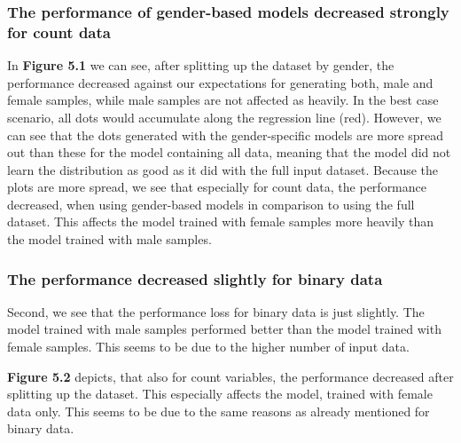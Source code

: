 \documentclass[11pt, a4paper, oneside]{book}
\begin{document}
\subsubsection{The performance of gender-based models decreased strongly for count data}
In \textbf{Figure 5.1} we can see, after splitting up the dataset by gender, the performance decreased against our expectations for generating both, male and female samples, while male samples are not affected as heavily. In the best case scenario, all dots would accumulate along the regression line (red). However, we can see that the dots generated with the gender-specific models are more spread out than these for the model containing all data, meaning that the model did not learn the distribution as good as it did with the full input dataset.
Because the plots are more spread, we see that especially for count data, the performance decreased, when using gender-based models in comparison to using the full dataset. This affects the model trained with female samples more heavily than the model trained with male samples.

\subsubsection{The performance decreased slightly for binary data}
Second, we see that the performance loss for binary data is just slightly. The model trained with male samples performed better than the model trained with female samples. This seems to be due to the higher number of input data.


\textbf{Figure 5.2} depicts, that also for count variables, the performance decreased after splitting up the dataset. This especially affects the model, trained with female data only. This seems to be due to the same reasons as already mentioned for binary data.
\end{document}

